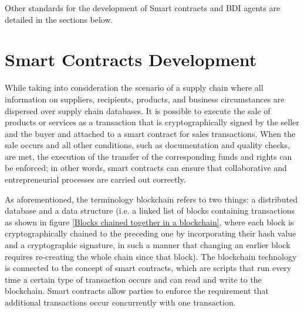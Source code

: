 \vspace{.5cm}

Other standards for the development of Smart contracts and \ac{BDI} agents are detailed in the sections below.

\section{Smart Contracts Development }   

While taking into consideration the scenario of a supply chain where all information on suppliers, recipients, products, and business circumstances are dispersed over supply chain databases.
It is possible to execute the sale of products or services as a transaction that is cryptographically signed by the seller and the buyer and attached to a smart contract for sales transactions. When the sale occurs and all other conditions, such as documentation and quality checks, are met, the execution of the transfer of the corresponding funds and rights can be enforced; in other words, smart contracts can ensure that collaborative and entrepreneurial processes are carried out correctly.

\vspace{.5cm}

As aforementioned, the terminology blockchain refers to two things: a distributed database and a data structure (i.e. a linked list of blocks containing transactions as shown in figure \ref{Blocks chained together in a blockchain}, where each block is cryptographically chained to the preceding one by incorporating their hash value and a cryptographic signature, in such a manner that changing an earlier block requires re-creating the whole chain since that block). The blockchain technology is connected to the concept of smart contracts, which are scripts that run every time a certain type of transaction occurs and can read and write to the blockchain. Smart contracts allow parties to enforce the requirement that additional transactions occur concurrently with one transaction.

\vspace{.5cm}

